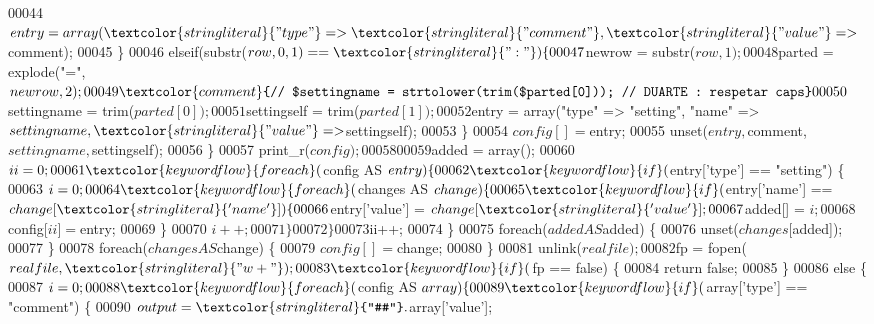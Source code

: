 \begin{DoxyCode}
00044           $entry = array(\textcolor{stringliteral}{"type"} => \textcolor{stringliteral}{"comment"}, \textcolor{stringliteral}{"value"} => $comment);
00045          \}
00046          elseif(substr($row, 0, 1) == \textcolor{stringliteral}{":"}) \{
00047           $newrow = substr($row, 1);
00048           $parted = explode(\textcolor{stringliteral}{"="}, $newrow, 2);
00049 \textcolor{comment}{//        $settingname = strtolower(trim($parted[0])); // DUARTE : respetar
       caps}
00050           $settingname = trim($parted[0]);
00051           $settingself = trim($parted[1]); 
00052           $entry = array(\textcolor{stringliteral}{"type"} => \textcolor{stringliteral}{"setting"}, \textcolor{stringliteral}{"name"} => $settingname, \textcolor{stringliteral}{"value"} =
      > $settingself);
00053          \}
00054          $config[] = $entry;
00055          unset($entry, $comment, $settingname, $settingself);
00056     \}
00057         print\_r($config);
00058         
00059         $added = array();
00060         $ii = 0;
00061         \textcolor{keywordflow}{foreach}($config AS $entry) \{
00062          \textcolor{keywordflow}{if}($entry[\textcolor{stringliteral}{'type'}] == \textcolor{stringliteral}{"setting"}) \{
00063           $i = 0;
00064           \textcolor{keywordflow}{foreach}($changes AS $change) \{
00065            \textcolor{keywordflow}{if}($entry[\textcolor{stringliteral}{'name'}] == $change[\textcolor{stringliteral}{'name'}]) \{
00066             $entry[\textcolor{stringliteral}{'value'}] = $change[\textcolor{stringliteral}{'value'}];
00067                 $added[] = $i;
00068                 $config[$ii] = $entry;
00069            \}
00070            $i++;
00071           \}
00072          \}
00073          $ii++;
00074         \}
00075         \textcolor{keywordflow}{foreach}($added AS $added) \{
00076          unset($changes[$added]);
00077         \}
00078         \textcolor{keywordflow}{foreach}($changes AS $change) \{
00079          $config[] = $change;
00080         \}
00081         unlink($realfile);
00082         $fp = fopen($realfile, \textcolor{stringliteral}{"w+"});
00083     \textcolor{keywordflow}{if}($fp == \textcolor{keyword}{false}) \{
00084      \textcolor{keywordflow}{return} \textcolor{keyword}{false};
00085     \}
00086     \textcolor{keywordflow}{else} \{
00087          $i = 0;
00088      \textcolor{keywordflow}{foreach}($config AS $array) \{
00089           \textcolor{keywordflow}{if}($array[\textcolor{stringliteral}{'type'}] == \textcolor{stringliteral}{"comment"}) \{
00090            $output = \textcolor{stringliteral}{"#"}.$array[\textcolor{stringliteral}{'value'}];

\end{DoxyCode}
